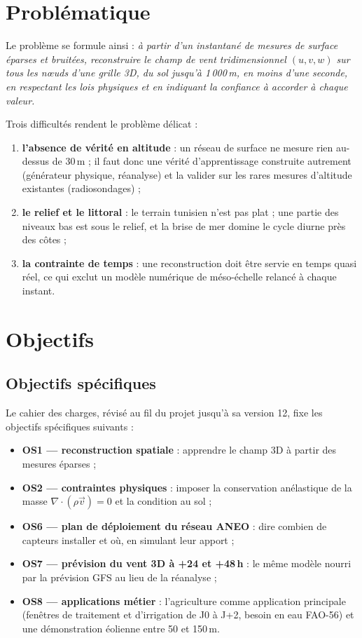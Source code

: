 \section{Problématique}
Le problème se formule ainsi : \emph{à partir d'un instantané de mesures de surface éparses et
bruitées, reconstruire le champ de vent tridimensionnel $(u, v, w)$ sur tous les nœuds d'une grille
3D, du sol jusqu'à 1\,000\,m, en moins d'une seconde, en respectant les lois physiques et en
indiquant la confiance à accorder à chaque valeur.}

Trois difficultés rendent le problème délicat :
\begin{enumerate}
  \item \textbf{l'absence de vérité en altitude} : un réseau de surface ne mesure rien au-dessus de
        30\,m ; il faut donc une vérité d'apprentissage construite autrement (générateur physique,
        réanalyse) et la valider sur les rares mesures d'altitude existantes (radiosondages) ;
  \item \textbf{le relief et le littoral} : le terrain tunisien n'est pas plat ; une partie des
        niveaux bas est sous le relief, et la brise de mer domine le cycle diurne près des côtes ;
  \item \textbf{la contrainte de temps} : une reconstruction doit être servie en temps quasi réel,
        ce qui exclut un modèle numérique de méso-échelle relancé à chaque instant.
\end{enumerate}

\section{Objectifs}

\subsection{Objectifs spécifiques}
Le cahier des charges, révisé au fil du projet jusqu'à sa version 12, fixe les objectifs
spécifiques suivants :
\begin{itemize}
  \item \textbf{OS1 --- reconstruction spatiale} : apprendre le champ 3D à partir des mesures
        éparses ;
  \item \textbf{OS2 --- contraintes physiques} : imposer la conservation anélastique de la masse
        $\nabla\cdot(\rho\vec{v}) = 0$ et la condition au sol ;
  \item \textbf{OS6 --- plan de déploiement du réseau ANEO} : dire combien de capteurs installer
        et où, en simulant leur apport ;
  \item \textbf{OS7 --- prévision du vent 3D à +24 et +48\,h} : le même modèle nourri par la
        prévision GFS au lieu de la réanalyse ;
  \item \textbf{OS8 --- applications métier} : l'agriculture comme application principale
        (fenêtres de traitement et d'irrigation de J0 à J+2, besoin en eau FAO-56) et une
        démonstration éolienne entre 50 et 150\,m.
\end{itemize}

